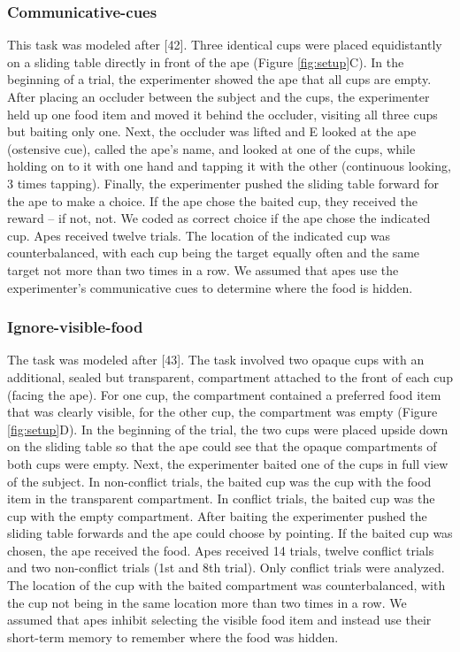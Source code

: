 \documentclass[
  man,floatsintext]{apa6}
\begin{document}
\subsubsection{Communicative-cues}\label{communicative-cues}

This task was modeled after {[}42{]}. Three identical cups were placed equidistantly on a sliding table directly in front of the ape (Figure \ref{fig:setup}C). In the beginning of a trial, the experimenter showed the ape that all cups are empty. After placing an occluder between the subject and the cups, the experimenter held up one food item and moved it behind the occluder, visiting all three cups but baiting only one. Next, the occluder was lifted and E looked at the ape (ostensive cue), called the ape's name, and looked at one of the cups, while holding on to it with one hand and tapping it with the other (continuous looking, 3 times tapping). Finally, the experimenter pushed the sliding table forward for the ape to make a choice. If the ape chose the baited cup, they received the reward -- if not, not. We coded as correct choice if the ape chose the indicated cup. Apes received twelve trials. The location of the indicated cup was counterbalanced, with each cup being the target equally often and the same target not more than two times in a row. We assumed that apes use the experimenter's communicative cues to determine where the food is hidden.

\subsubsection{Ignore-visible-food}\label{ignore-visible-food}

The task was modeled after {[}43{]}. The task involved two opaque cups with an additional, sealed but transparent, compartment attached to the front of each cup (facing the ape). For one cup, the compartment contained a preferred food item that was clearly visible, for the other cup, the compartment was empty (Figure \ref{fig:setup}D). In the beginning of the trial, the two cups were placed upside down on the sliding table so that the ape could see that the opaque compartments of both cups were empty. Next, the experimenter baited one of the cups in full view of the subject. In non-conflict trials, the baited cup was the cup with the food item in the transparent compartment. In conflict trials, the baited cup was the cup with the empty compartment. After baiting the experimenter pushed the sliding table forwards and the ape could choose by pointing. If the baited cup was chosen, the ape received the food. Apes received 14 trials, twelve conflict trials and two non-conflict trials (1st and 8th trial). Only conflict trials were analyzed. The location of the cup with the baited compartment was counterbalanced, with the cup not being in the same location more than two times in a row. We assumed that apes inhibit selecting the visible food item and instead use their short-term memory to remember where the food was hidden.
\end{document}
